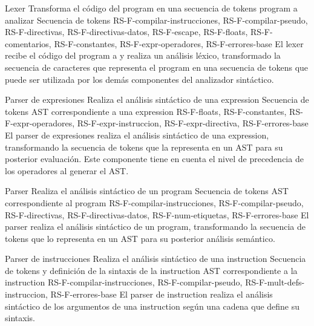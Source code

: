 \begin{component}{Lexer}
    {Transforma el código del \gls{program} en una secuencia de \glspl{token}} %
    {} %
    {\Gls{program} a analizar} %
    {Secuencia de \glspl{token}} %
    {RS-F-compilar-instrucciones, RS-F-compilar-pseudo, RS-F-directivas,
    RS-F-directivas-datos, RS-F-escape, RS-F-floats, RS-F-comentarios, RS-F-constantes, RS-F-expr-operadores, RS-F-errores-base} %
    El lexer recibe el código del \gls{program} a
     y realiza un análisis léxico, transformado
    la secuencia de caracteres que representa el \gls{program} en una secuencia
    de \glspl{token} que puede ser utilizada por los demás componentes del
    analizador sintáctico.
\end{component}

\begin{component}{Parser de expresiones}
    {Realiza el análisis sintáctico de una \gls{expression}} %
    {} %
    {Secuencia de \glspl{token}} %
    {\gls{AST} correspondiente a una \gls{expression}} %
    {RS-F-floats, RS-F-constantes, RS-F-expr-operadores, RS-F-expr-instruccion, RS-F-expr-directiva, RS-F-errores-base} %
    El \gls{parser} de expresiones realiza el análisis sintáctico de una
    \gls{expression}, transformando la secuencia de \glspl{token} que la
    representa en un \gls{AST} para su posterior evaluación. Este componente
    tiene en cuenta el nivel de precedencia de los operadores al generar el
    \gls{AST}.
\end{component}

\begin{component}{Parser}
    {Realiza el análisis sintáctico de un \gls{program}} %
    {} %
    {Secuencia de \glspl{token}} %
    {\gls{AST} correspondiente al \gls{program}} %
    {RS-F-compilar-instrucciones, RS-F-compilar-pseudo, RS-F-directivas, RS-F-directivas-datos, RS-F-num-etiquetas, RS-F-errores-base} %
    El \gls{parser} realiza el análisis sintáctico de un \gls{program},
    transformando la secuencia de \glspl{token} que lo representa en un
    \gls{AST} para su posterior análisis semántico.
\end{component}

\begin{component}{Parser de instrucciones}
    {Realiza el análisis sintáctico de una \gls{instruction}} %
    {} %
    {Secuencia de \glspl{token} y definición de la sintaxis de la \gls{instruction}} %
    {\gls{AST} correspondiente a la \gls{instruction}} %
    {RS-F-compilar-instrucciones, RS-F-compilar-pseudo, RS-F-mult-defs-instruccion, RS-F-errores-base} %
    El \gls{parser} de \gls{instruction} realiza el análisis sintáctico de los
    argumentos de una \gls{instruction} según una cadena que define su sintaxis.
\end{component}

